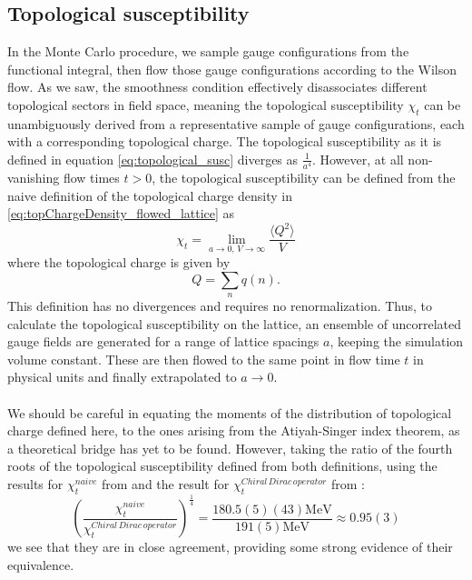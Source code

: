 \documentclass[a4paper,10pt]{book}
\begin{document}
\subsection{Topological susceptibility}
In the Monte Carlo procedure, we sample gauge configurations from the functional integral, then flow those gauge configurations according to the Wilson flow. As we saw, the smoothness condition effectively disassociates different topological sectors in field space, meaning the topological susceptibility $\chi_t$ can be unambiguously derived from a representative sample of gauge configurations, each with a corresponding topological charge.
The topological susceptibility as it is defined in equation \eqref{eq:topological_susc} diverges as $\frac{1}{a^4}$. However, at all non-vanishing flow times $t>0$, the topological susceptibility can be defined from the naive definition of the topological charge density in \eqref{eq:topChargeDensity_flowed_lattice} as
\begin{equation}
\chi_t = \lim\limits_{a\rightarrow0,\,V\rightarrow \infty}\frac{\langle Q^2 \rangle}{V}
\end{equation}
where the topological charge is given by
\begin{equation}
Q=\sum_{n} q(n).
\end{equation}
This definition has no divergences and requires no renormalization. Thus, to calculate the topological susceptibility on the lattice, an ensemble of uncorrelated gauge fields are generated for a range of lattice spacings $a$, keeping the simulation volume constant. These are then flowed to the same point in flow time $t$ in physical units and finally extrapolated to $a\rightarrow 0$.\\\\We should be careful in equating the moments of the distribution of topological charge defined here, to the ones arising from the Atiyah-Singer index theorem, as a theoretical bridge has yet to be found. However, taking the ratio of the fourth roots of the topological susceptibility defined from both definitions, using the results for $\chi_t^{naive}$ from \cite{non_gaussianities2015} and the result for $\chi_t^{Chiral\,Dirac \,operator}$ from \cite{PhysRevLett.94.032003}:
\begin{equation}
\left( \frac{\chi_t^{naive}}{\chi_t^{Chiral\,Dirac \,operator}} \right)^{\frac{1}{4}}=\frac{180.5(5)(43) \mathrm{MeV}}{191(5) \mathrm{MeV}} \approx 0.95(3)
\end{equation}
we see that they are in close agreement, providing some strong evidence of their equivalence.
\end{document}
